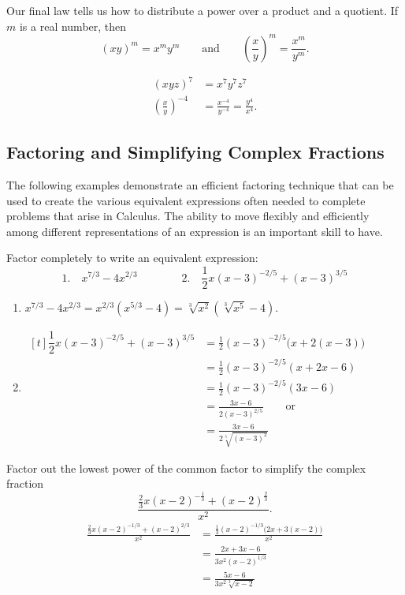 Our final law tells us how to distribute a power over a product and a quotient.  If $m$ is a real number, then
\[(xy)^m = x^m y^m\qquad\text{and}\qquad\left(\frac{x}{y}\right)^m=\frac{x^m}{y^m}.\]

\begin{example}\label{prereq_exp_dist}
\setlength{\abovedisplayskip}{-1.5ex}
\begin{align*}
 (xyz)^7 &= x^7y^7z^7 \\
 \left(\frac{x}{y}\right)^{-4} &= \frac{x^{-4}}{y^{-4}}=\frac{y^{4}}{x^{4}}.
\end{align*}
\end{example}

\subsection{Factoring and Simplifying Complex Fractions}

The following examples demonstrate an efficient factoring technique that can be used to create the various equivalent expressions often needed to complete problems that arise in Calculus. The ability to move flexibly and efficiently among different representations of an expression is an important skill to have.

\begin{example}\label{ex_prereq_gcf}
Factor completely to write an equivalent expression:
\[
 \text{1.}\quad x^{7/3}-4x^{2/3} \qquad\qquad
 \text{2.}\quad \frac12 x(x-3)^{-2/5}+(x-3)^{3/5}
\]
\solution
\begin{enumerate}
\item\hfill
$x^{7/3}-4x^{2/3}=x^{2/3}(x^{5/3}-4)=\sqrt[3]{x^2}(\sqrt[3]{x^5}-4)$.\hfill\null
\item
\hfill$\begin{aligned}[t]
 \dfrac12 x(x-3)^{-2/5}+(x-3)^{3/5}
 &= \frac12 (x-3)^{-2/5}\bigl(x + 2(x -3)\bigr)\\
 &= \frac12 (x-3)^{-2/5}(x + 2x -6)\\
 &= \frac12 (x-3)^{-2/5}(3x -6) \\
 &= \frac{3x-6}{2(x-3)^{2/5}} \qquad\text{or} \\
 &= \frac{3x-6}{2\sqrt[5]{(x-3)^2}}
\end{aligned}$\hfill\null
\end{enumerate}
\end{example}

\begin{example}\label{ex_prereq_fraction}
Factor out the lowest power of the common factor to simplify the complex fraction\vspace{-.3\baselineskip}
\[\frac{\frac23 x(x-2)^{-\frac13}+(x-2)^{\frac23}}{x^2}.\]
\solution
\begin{align*}
 \frac{\frac23 x(x-2)^{-1/3}+(x-2)^{2/3}}{x^2}
 &= \frac{\frac13 (x-2)^{-1/3}\bigl(2x + 3(x-2)\bigr)}{x^2} \\
 &= \frac{2x+3x-6}{3x^2(x-2)^{1/3}}\\
 &= \frac{5x-6}{3x^2\sqrt[3]{x-2}}
\end{align*}
\end{example}

